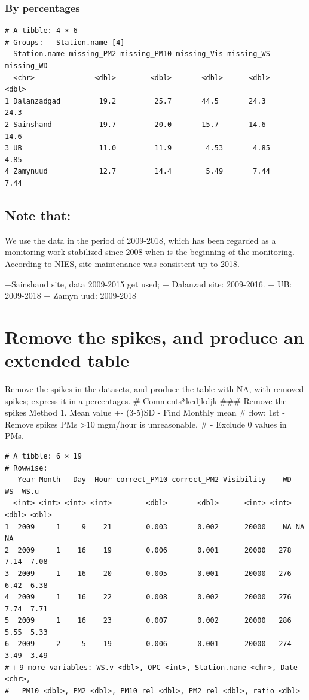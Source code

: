 \documentclass[
]{agujournal2019}
\begin{document}
\subsubsection{By percentages}\label{by-percentages}

\begin{verbatim}
# A tibble: 4 × 6
# Groups:   Station.name [4]
  Station.name missing_PM2 missing_PM10 missing_Vis missing_WS missing_WD
  <chr>              <dbl>        <dbl>       <dbl>      <dbl>      <dbl>
1 Dalanzadgad         19.2         25.7       44.5       24.3       24.3 
2 Sainshand           19.7         20.0       15.7       14.6       14.6 
3 UB                  11.0         11.9        4.53       4.85       4.85
4 Zamynuud            12.7         14.4        5.49       7.44       7.44
\end{verbatim}

\subsection{Note that:}\label{note-that}

We use the data in the period of 2009-2018, which has been regarded as a
monitoring work stabilized since 2008 when is the beginning of the
monitoring. According to NIES, site maintenance was consistent up to
2018.

+Sainshand site, data 2009-2015 get used; + Dalanzad site: 2009-2016. +
UB: 2009-2018 + Zamyn uud: 2009-2018

\section{Remove the spikes, and produce an extended
table}\label{remove-the-spikes-and-produce-an-extended-table}

Remove the spikes in the datasets, and produce the table with NA, with
removed spikes; express it in a percentages. \#\textbar{}
Comments*kedjkdjk \#\#\# Remove the spikes Method 1. Mean value +-
(3-5)SD - Find Monthly mean \#\textbar{} flow: 1st - Remove spikes PMs
\textgreater10 mgm/hour is unreasonable. \#\textbar{} - Exclude 0 values
in PMs.

\begin{verbatim}
# A tibble: 6 × 19
# Rowwise: 
   Year Month   Day  Hour correct_PM10 correct_PM2 Visibility    WD    WS  WS.u
  <int> <int> <int> <int>        <dbl>       <dbl>      <int> <int> <dbl> <dbl>
1  2009     1     9    21        0.003       0.002      20000    NA NA    NA   
2  2009     1    16    19        0.006       0.001      20000   278  7.14  7.08
3  2009     1    16    20        0.005       0.001      20000   276  6.42  6.38
4  2009     1    16    22        0.008       0.002      20000   276  7.74  7.71
5  2009     1    16    23        0.007       0.002      20000   286  5.55  5.33
6  2009     2     5    19        0.006       0.001      20000   274  3.49  3.49
# ℹ 9 more variables: WS.v <dbl>, OPC <int>, Station.name <chr>, Date <chr>,
#   PM10 <dbl>, PM2 <dbl>, PM10_rel <dbl>, PM2_rel <dbl>, ratio <dbl>
\end{verbatim}
\end{document}
